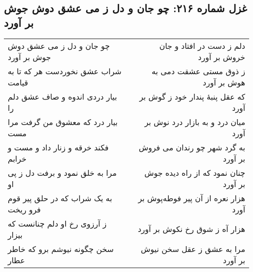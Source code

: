 \begin{center}
\section*{غزل شماره ۲۱۶: چو جان و دل ز می عشق دوش جوش بر آورد}
\label{sec:216}
\begin{longtable}{l p{0.5cm} r}
چو جان و دل ز می عشق دوش جوش بر آورد
&&
دلم ز دست در افتاد و جان خروش بر آورد
\\
شراب عشق نخوردست هر که تا به قیامت
&&
ز ذوق مستی عشقت دمی به هوش بر آورد
\\
بیار دردی اندوه و صاف عشق دلم را
&&
که عقل پنبهٔ پندار خود ز گوش بر آورد
\\
بیار درد که معشوق من گرفت مرا مست
&&
میان درد و به بازار درد نوش بر آورد
\\
فکند خرقه و زنار داد و مست و خرابم
&&
به گرد شهر چو رندان می فروش بر آورد
\\
مرا به خلق نمود و برفت دل ز پی او
&&
چنان نمود که از راه دیده جوش بر آورد
\\
به یک شراب که در حلق پیر قوم فرو ریخت
&&
هزار نعره از آن پیر فوطه‌پوش بر آورد
\\
ز آرزوی رخ او دلم چنانست که بیزار
&&
هزار آه ز شوق رخ نکوش بر آورد
\\
سخن چگونه نیوشم برو که خاطر عطار
&&
مرا به عشق ز عقل سخن نیوش بر آورد
\\
\end{longtable}
\end{center}
